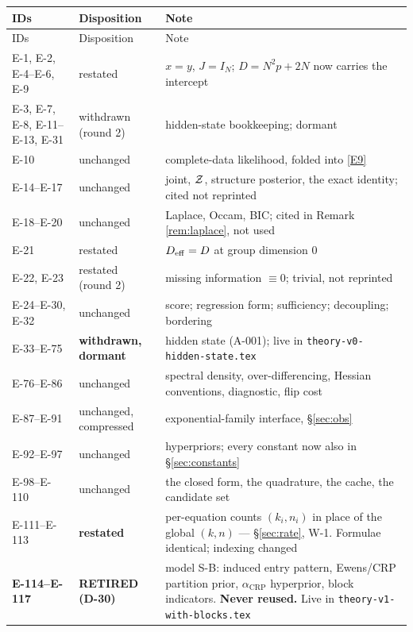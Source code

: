 {\small
\begin{longtable}{@{}>{\raggedright\arraybackslash}p{4.4cm}
                    >{\raggedright\arraybackslash}p{3.4cm}
                    >{\raggedright\arraybackslash}p{8.9cm}@{}}
\toprule
IDs & Disposition & Note \\
\midrule
\endfirsthead
\toprule
IDs & Disposition & Note \\
\midrule
\endhead
\bottomrule
\endlastfoot
E-1, E-2, E-4--E-6, E-9 & restated &
  $x=y$, $J=I_N$; $D=N^2p+2N$ now carries the intercept \\
E-3, E-7, E-8, E-11--E-13, E-31 & withdrawn (round 2) &
  hidden-state bookkeeping; dormant \\
E-10 & unchanged & complete-data likelihood, folded into \eqref{E9} \\
E-14--E-17 & unchanged &
  joint, $\mathcal{Z}$, structure posterior, the exact identity; cited not reprinted \\
E-18--E-20 & unchanged &
  Laplace, Occam, BIC; cited in Remark \ref{rem:laplace}, not used \\
E-21 & restated & $D_{\mathrm{eff}}=D$ at group dimension 0 \\
E-22, E-23 & restated (round 2) &
  missing information $\equiv0$; trivial, not reprinted \\
E-24--E-30, E-32 & unchanged &
  score; regression form; sufficiency; decoupling; bordering \\
E-33--E-75 & \textbf{withdrawn, dormant} &
  hidden state (A-001); live in \texttt{theory-v0-hidden-state.tex} \\
\midrule
E-76--E-86 & unchanged &
  spectral density, over-differencing, Hessian conventions, diagnostic, flip cost \\
E-87--E-91 & unchanged, compressed &
  exponential-family interface, \S\ref{sec:obs} \\
E-92--E-97 & unchanged &
  hyperpriors; every constant now also in \S\ref{sec:constants} \\
E-98--E-110 & unchanged &
  the closed form, the quadrature, the cache, the candidate set \\
E-111--E-113 & \textbf{restated} &
  per-equation counts $(k_i,n_i)$ in place of the global $(k,n)$ ---
  \S\ref{sec:rate}, W-1. Formulae identical; indexing changed \\
\textbf{E-114--E-117} & \textbf{RETIRED (D-30)} &
  model S-B: induced entry pattern, Ewens/CRP partition prior, $\alpha_{\text{CRP}}$
  hyperprior, block indicators. \textbf{Never reused.} Live in
  \texttt{theory-v1-with-blocks.tex} \\

\end{longtable}}
